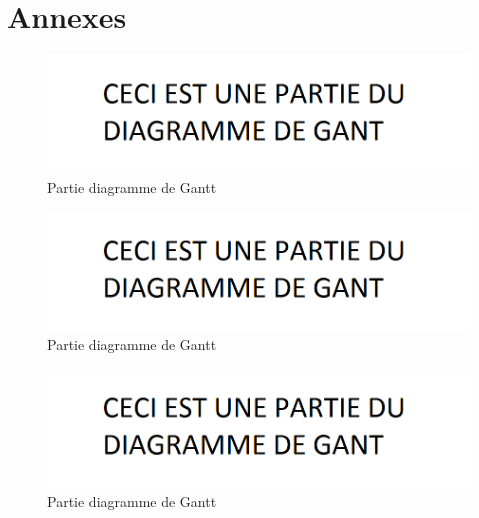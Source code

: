 \section{Annexes}
\label{sec:annexes}

	\begin{figure}[H]
        \centering
        \includegraphics[width=\textwidth]{figure/gantt.png}
            \caption{Partie diagramme de Gantt}
            \label{fig:gantt}
    \end{figure}

    \begin{figure}[H]
        \centering
        \includegraphics[width=\textwidth]{figure/gantt.png}
            \caption{Partie diagramme de Gantt}
            \label{fig:gantt}
    \end{figure}

    \begin{figure}[H]
        \centering
        \includegraphics[width=\textwidth]{figure/gantt.png}
            \caption{Partie diagramme de Gantt}
            \label{fig:gantt}
    \end{figure}